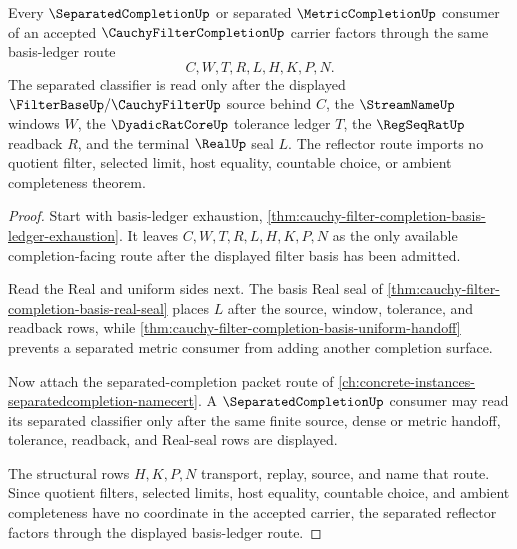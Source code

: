 \begin{theorem}
\label{thm:cauchy-filter-completion-basis-separated-reflector}
Every $\SeparatedCompletionUp$ or separated $\MetricCompletionUp$ consumer of an accepted $\CauchyFilterCompletionUp$ carrier factors through the same basis-ledger route
$$
C,W,T,R,L,H,K,P,N .
$$
The separated classifier is read only after the displayed $\FilterBaseUp/\CauchyFilterUp$ source behind $C$, the $\StreamNameUp$ windows $W$, the $\DyadicRatCoreUp$ tolerance ledger $T$, the $\RegSeqRatUp$ readback $R$, and the terminal $\RealUp$ seal $L$. The reflector route imports no quotient filter, selected limit, host equality, countable choice, or ambient completeness theorem.
\end{theorem}
\begin{proof}
Start with basis-ledger exhaustion, \autoref{thm:cauchy-filter-completion-basis-ledger-exhaustion}. It leaves $C,W,T,R,L,H,K,P,N$ as the only available completion-facing route after the displayed filter basis has been admitted.

Read the Real and uniform sides next. The basis Real seal of \autoref{thm:cauchy-filter-completion-basis-real-seal} places $L$ after the source, window, tolerance, and readback rows, while \autoref{thm:cauchy-filter-completion-basis-uniform-handoff} prevents a separated metric consumer from adding another completion surface.

Now attach the separated-completion packet route of \autoref{ch:concrete-instances-separatedcompletion-namecert}. A $\SeparatedCompletionUp$ consumer may read its separated classifier only after the same finite source, dense or metric handoff, tolerance, readback, and Real-seal rows are displayed.

The structural rows $H,K,P,N$ transport, replay, source, and name that route. Since quotient filters, selected limits, host equality, countable choice, and ambient completeness have no coordinate in the accepted carrier, the separated reflector factors through the displayed basis-ledger route.
\end{proof}
